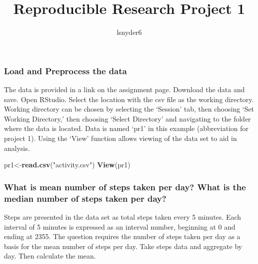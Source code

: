 \documentclass[]{article}
\title{Reproducible Research Project 1}
\author{lsnyder6}
\date{}
\newenvironment{Shaded}{\begin{snugshade}}{\end{snugshade}}
\newcommand{\KeywordTok}[1]{\textcolor[rgb]{0.13,0.29,0.53}{\textbf{#1}}}
\newcommand{\DataTypeTok}[1]{\textcolor[rgb]{0.13,0.29,0.53}{#1}}
\newcommand{\StringTok}[1]{\textcolor[rgb]{0.31,0.60,0.02}{#1}}
\newcommand{\OperatorTok}[1]{\textcolor[rgb]{0.81,0.36,0.00}{\textbf{#1}}}
\newcommand{\NormalTok}[1]{#1}
\begin{document}
\maketitle

\subsubsection{Load and Preprocess the
data}\label{load-and-preprocess-the-data}

The data is provided in a link on the assignment page. Download the data
and save. Open RStudio. Select the location with the csv file as the
working directory. Working directory can be chosen by selecting the
`Session' tab, then choosing `Set Working Directory,' then choosing
`Select Directory' and navigating to the folder where the data is
located. Data is named `pr1' in this example (abbreviation for project
1). Using the `View' function allows viewing of the data set to aid in
analysis.

\begin{Shaded}
\begin{Highlighting}[]
\NormalTok{pr1<-}\KeywordTok{read.csv}\NormalTok{(}\StringTok{"activity.csv"}\NormalTok{)}
\KeywordTok{View}\NormalTok{(pr1)}
\end{Highlighting}
\end{Shaded}

\subsubsection{What is mean number of steps taken per day? What is the
median number of steps taken per
day?}\label{what-is-mean-number-of-steps-taken-per-day-what-is-the-median-number-of-steps-taken-per-day}

Steps are presented in the data set as total steps taken every 5
minutes. Each interval of 5 minutes is expressed as an interval number,
beginning at 0 and ending at 2355. The question requires the number of
steps taken per day as a basis for the mean number of steps per day.
Take steps data and aggregate by day. Then calculate the mean.

\begin{Shaded}
\end{Shaded}
\end{document}
